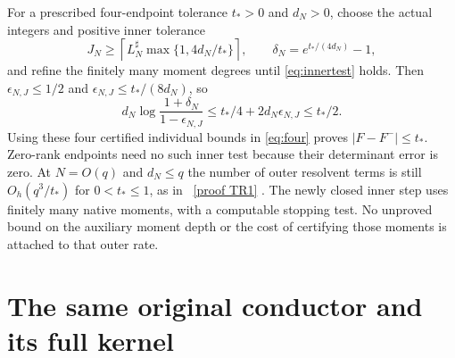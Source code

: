 \documentclass[11pt]{article}
\begin{document}
For a prescribed four-endpoint tolerance $t_*>0$ and $d_N>0$, choose
the actual integers and positive inner tolerance
\begin{equation}\label{eq:tolerance}
 J_N\ge\left\lceil L_N^\sharp\max\{1,4d_N/t_*\}\right\rceil,
 \qquad\delta_N=e^{t_*/(4d_N)}-1,
\end{equation}
and refine the finitely many moment degrees until \eqref{eq:innertest}
holds.  Then $\epsilon_{N,J}\le1/2$ and
$\epsilon_{N,J}\le t_*/(8d_N)$, so
\[
 d_N\log\frac{1+\delta_N}{1-\epsilon_{N,J}}
 \le t_*/4+2d_N\epsilon_{N,J}\le t_*/2.
\]
Using these four certified individual bounds in \eqref{eq:four}
proves $|F-F^-|\le t_*$.  Zero-rank endpoints need no such inner
test because their determinant error is zero.  At $N=O(q)$ and
$d_N\le q$ the number of outer resolvent terms is still
$O_h(q^3/t_*)$ for $0<t_*\le1$, as in \cite{TR}%
~\href{https://github.com/KokunoYumeto/zeta-function-research-reader/blob/5992ad50c0f2a06921f1fcaded7b4e38097c0739/workbenches/splitzero-tandem/continuations/20260920-original-kernel-mixed-determinants/providers/NATIVE_TRUNCATION_CONDUCTOR_RETURN.tex\#L54}{[proof TR1]}%
{}.  The newly closed
inner step uses finitely many native moments, with a computable
stopping test.  No unproved bound on the auxiliary moment depth or
the cost of certifying those moments is attached to that outer rate.

\section{The same original conductor and its full kernel}
\end{document}
